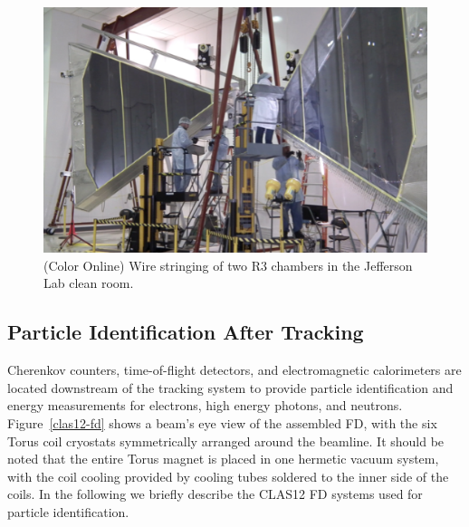 \documentclass[final,3p,twocolumn]{elsarticle}
\begin{document}
\begin{figure}[htbp!]
\centerline{\includegraphics[width=1.95\columnwidth]{DC-R3.png}}
\caption{(Color Online) Wire stringing of two R3 chambers in the Jefferson Lab clean room.}
\label{dc-stringing}
\end{figure}

\subsection{Particle Identification After Tracking}

Cherenkov counters, time-of-flight detectors, and electromagnetic calorimeters are located downstream of the
tracking system to provide particle identification and energy measurements for electrons, high energy photons,
and neutrons.  Figure~\ref{clas12-fd} shows a beam's eye view of the assembled FD, with the six Torus coil
cryostats symmetrically arranged around the beamline. It should be noted that the entire Torus magnet is placed
in one hermetic vacuum system, with the coil cooling provided by cooling tubes soldered to the inner side of the coils.  
In the following we briefly describe the CLAS12 FD systems used for particle identification. 

\end{document}
